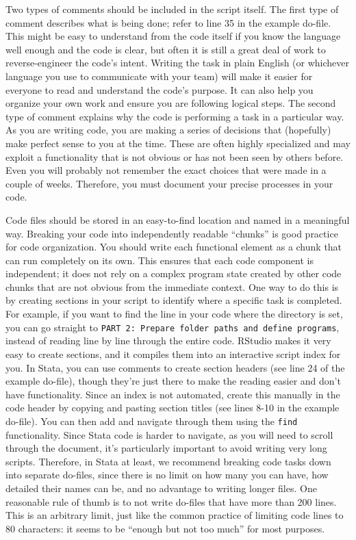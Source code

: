 Two types of comments should be included in the script itself.
The first type of comment describes what is being done;
refer to line 35 in the example do-file.
This might be easy to understand from the code itself
if you know the language well enough and the code is clear,
but often it is still a great deal of work to reverse-engineer the code's intent.
Writing the task in plain English (or whichever language you use to communicate with your team)
will make it easier for everyone to read and understand the code's purpose.
It can also help you organize your own work and ensure you are following logical steps.
The second type of comment explains why the code is performing a task in a particular way.
As you are writing code, you are making a series of decisions that
(hopefully) make perfect sense to you at the time.
These are often highly specialized and may exploit a functionality
that is not obvious or has not been seen by others before.
Even you will probably not remember the exact choices that were made in a couple of weeks.
Therefore, you must document your precise processes in your code.

Code files should be stored in an easy-to-find location and named in a meaningful way.
Breaking your code into independently readable ``chunks'' is good practice for code organization.
You should write each functional element as a chunk that can run completely on its own.
This ensures that each code component is independent; 
it does not rely on a complex program state
created by other code chunks that are not obvious from the immediate context.
One way to do this is by creating sections in your script to identify where a specific task is completed.
For example, if you want to find the line in your code where the directory is set,
you can go straight to \texttt{PART 2: Prepare folder paths and define programs},
instead of reading line by line through the entire code.
RStudio makes it very easy to create sections,
and it compiles them into an interactive script index for you.
In Stata, you can use comments to create section headers 
(see line 24 of the example do-file),
though they're just there to make the reading easier and don't have functionality.
Since an index is not automated, 
create this manually in the code header by copying and pasting section titles
(see lines 8-10 in the example do-file).
You can then add and navigate through them using the \texttt{find} functionality.
Since Stata code is harder to navigate, as you will need to scroll through the document,
it's particularly important to avoid writing very long scripts.
Therefore, in Stata at least, we recommend breaking code tasks down
into separate do-files, since there is no limit on how many you can have,
how detailed their names can be, and no advantage to writing longer files.
One reasonable rule of thumb is to not write do-files that have more than 200 lines.
This is an arbitrary limit, just like the common practice of limiting code lines to 80 characters:
it seems to be ``enough but not too much'' for most purposes.

